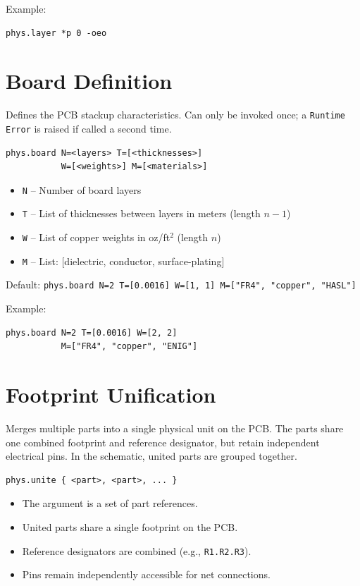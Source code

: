 Example:
\begin{verbatim}
phys.layer *p 0 -oeo
\end{verbatim}

\section{Board Definition}
Defines the PCB stackup characteristics. Can only be invoked once; a \texttt{Runtime Error} is raised if called a second time.
\begin{verbatim}
phys.board N=<layers> T=[<thicknesses>] 
           W=[<weights>] M=[<materials>]
\end{verbatim}
\begin{itemize}
\item \texttt{N} -- Number of board layers
\item \texttt{T} -- List of thicknesses between layers in meters (length $n-1$)
\item \texttt{W} -- List of copper weights in oz/ft$^2$ (length $n$)
\item \texttt{M} -- List: [dielectric, conductor, surface-plating]
\end{itemize}

Default: \texttt{phys.board N=2 T=[0.0016] W=[1, 1] 
         M=["FR4", "copper", "HASL"]}

Example:
\begin{verbatim}
phys.board N=2 T=[0.0016] W=[2, 2] 
           M=["FR4", "copper", "ENIG"]
\end{verbatim}

\section{Footprint Unification}
Merges multiple parts into a single physical unit on the PCB. The parts share one combined footprint and reference designator, but retain independent electrical pins. In the schematic, united parts are grouped together.
\begin{verbatim}
phys.unite { <part>, <part>, ... }
\end{verbatim}

\begin{itemize}
\item The argument is a set of part references.
\item United parts share a single footprint on the PCB.
\item Reference designators are combined (e.g., \texttt{R1.R2.R3}).
\item Pins remain independently accessible for net connections.
\end{itemize}

